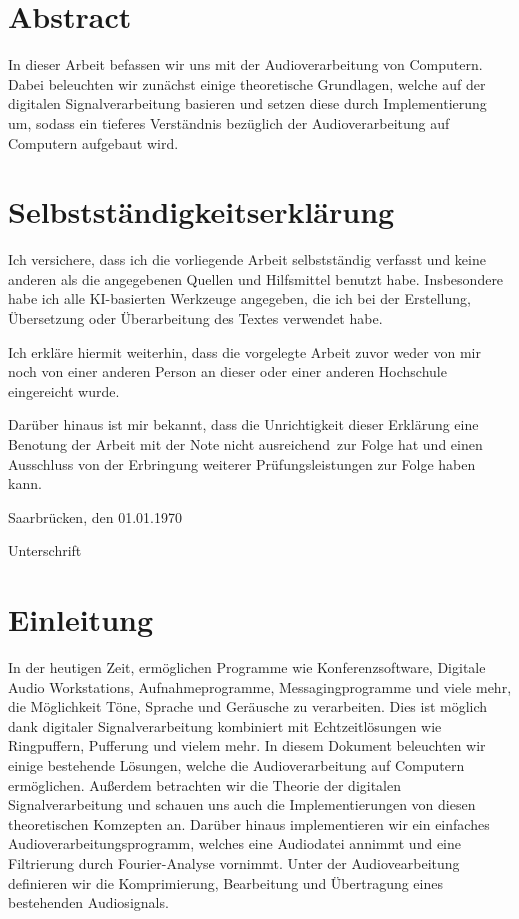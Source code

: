 \documentclass[paper=a4,fontsize=12pt,ngerman]{scrartcl}
\begin{document}
\pagestyle{plain}



\section*{Abstract}
In dieser Arbeit befassen wir uns mit der Audioverarbeitung von Computern.
Dabei beleuchten wir zunächst einige theoretische Grundlagen, welche auf der digitalen Signalverarbeitung basieren und setzen diese durch Implementierung um, sodass 
ein tieferes Verständnis bezüglich der Audioverarbeitung auf Computern aufgebaut wird.

\newpage
\section*{Selbstständigkeitserklärung}
Ich versichere, dass ich die vorliegende Arbeit selbstständig verfasst und 
keine anderen als die angegebenen Quellen und Hilfsmittel benutzt habe.
Insbesondere habe ich alle KI-basierten Werkzeuge angegeben, die ich bei
der Erstellung, Übersetzung oder Überarbeitung des Textes verwendet habe.

Ich erkläre hiermit weiterhin, dass die vorgelegte Arbeit zuvor weder von mir 
noch von einer anderen Person an dieser oder einer anderen Hochschule 
eingereicht wurde.

Darüber hinaus ist mir bekannt, dass die Unrichtigkeit dieser Erklärung eine 
Benotung der Arbeit mit der Note \glqq nicht ausreichend\grqq \ zur Folge hat 
und einen Ausschluss von der Erbringung weiterer Prüfungsleistungen zur Folge 
haben kann.
\bigskip
 
Saarbrücken, den 01.01.1970

\smallskip
Unterschrift




\clearpage
\tableofcontents 

\clearpage
{}

\section{Einleitung}
In der heutigen Zeit, ermöglichen Programme wie Konferenzsoftware, Digitale Audio Workstations, Aufnahmeprogramme, Messagingprogramme und viele mehr, die Möglichkeit Töne, Sprache und Geräusche zu verarbeiten. 
Dies ist möglich dank digitaler Signalverarbeitung kombiniert mit Echtzeitlösungen wie Ringpuffern, Pufferung und vielem mehr. 
In diesem Dokument beleuchten wir einige bestehende Lösungen, welche die Audioverarbeitung auf Computern ermöglichen. 
Außerdem betrachten wir die Theorie der digitalen Signalverarbeitung und schauen uns auch die Implementierungen von diesen theoretischen Komzepten an. 
Darüber hinaus implementieren wir ein einfaches Audioverarbeitungsprogramm, welches eine Audiodatei annimmt und eine Filtrierung durch Fourier-Analyse vornimmt. 
Unter der Audiovearbeitung definieren wir die Komprimierung, Bearbeitung und Übertragung eines bestehenden Audiosignals.
\end{document}

